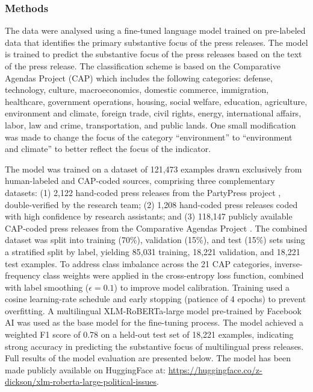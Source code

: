 \documentclass[
  letterpaper,
  DIV=11,
  numbers=noendperiod]{scrartcl}
\begin{document}
\subsubsection{Methods}\label{methods}

The data were analysed using a fine-tuned language model trained on
pre-labeled data that identifies the primary substantive focus of the
press releases. The model is trained to predict the substantive focus of
the press releases based on the text of the press release. The
classification scheme is based on the Comparative Agendas Project (CAP)
\citep{walgrave2019comparative} which includes the following categories:
defense, technology, culture, macroeconomics, domestic commerce,
immigration, healthcare, government operations, housing, social welfare,
education, agriculture, environment and climate, foreign trade, civil
rights, energy, international affairs, labor, law and crime,
transportation, and public lands. One small modification was made to
change the focus of the category ``environment'' to ``environment and
climate'' to better reflect the focus of the indicator.

The model was trained on a dataset of 121,473 examples drawn exclusively
from human-labeled and CAP-coded sources, comprising three complementary
datasets: (1) 2,122 hand-coded press releases from the PartyPress project
\citep{erfort2023partypress}, double-verified by the research team; (2)
1,208 hand-coded press releases coded with high confidence by research
assistants; and (3) 118,147 publicly available CAP-coded press releases
from the Comparative Agendas Project \citep{walgrave2019comparative}. The
combined dataset was split into training (70\%), validation (15\%), and
test (15\%) sets using a stratified split by label, yielding 85,031
training, 18,221 validation, and 18,221 test examples. To address class
imbalance across the 21 CAP categories, inverse-frequency class weights
were applied in the cross-entropy loss function, combined with label
smoothing ($\epsilon = 0.1$) to improve model calibration. Training used
a cosine learning-rate schedule and early stopping (patience of 4 epochs)
to prevent overfitting. A multilingual XLM-RoBERTa-large model pre-trained
by Facebook AI \citep{xlm_roberta} was used as the base model for the
fine-tuning process. The model achieved a weighted F1 score of 0.78 on a
held-out test set of 18,221 examples, indicating strong accuracy in
predicting the substantive focus of multilingual press releases. Full
results of the model evaluation are presented below. The model has been
made publicly available on HuggingFace at:
\url{https://huggingface.co/z-dickson/xlm-roberta-large-political-issues}.
\end{document}
